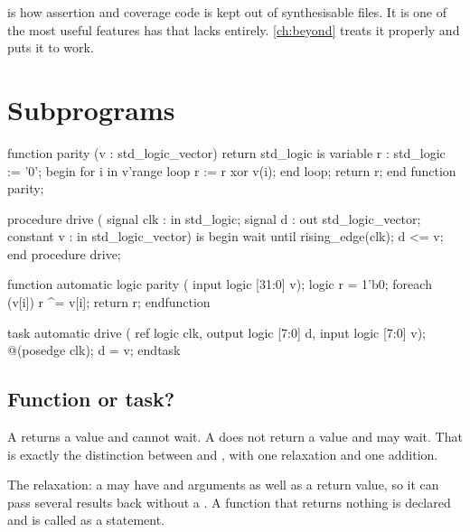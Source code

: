  is how assertion and coverage code is kept out of synthesisable
files. It is one of the most useful features \SV{} has that \VHDL{} lacks
entirely. \cref{ch:beyond} treats it properly and  puts it to
work.

\section{Subprograms}
\label{sec:rosetta:subprograms}

\begin{rosetta}
\begin{rleft}
function parity (v : std_logic_vector)
  return std_logic is
  variable r : std_logic := '0';
begin
  for i in v'range loop
    r := r xor v(i);
  end loop;
  return r;
end function parity;

procedure drive (
  signal   clk : in  std_logic;
  signal   d   : out std_logic_vector;
  constant v   : in  std_logic_vector) is
begin
  wait until rising_edge(clk);
  d <= v;
end procedure drive;
\end{rleft}
\begin{rright}
function automatic logic parity (
    input logic [31:0] v);
  logic r = 1'b0;
  foreach (v[i]) r ^= v[i];
  return r;
endfunction

task automatic drive (
    ref   logic        clk,
    output logic [7:0] d,
    input logic [7:0]  v);
  @(posedge clk);
  d = v;
endtask
\end{rright}
\end{rosetta}


\subsection{Function or task?}

A \VHDL{}  returns a value and cannot wait. A \VHDL{}
 does not return a value and may wait. That is exactly the \SV{}
distinction between  and , with one relaxation and one
addition.

The relaxation: a \SV{}  may have  and 
arguments as well as a return value, so it can pass several results back
without a . A function that returns nothing is declared
 and is called as a statement.

